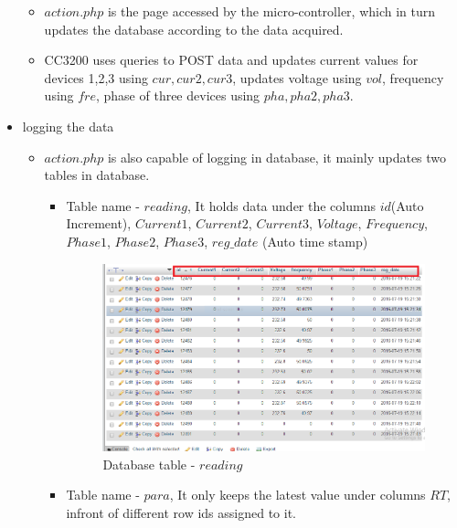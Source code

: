 \documentclass[a4paper,12pt,oneside]{book}
\begin{document}
\begin{itemize}
\begin{itemize}
		\item{$action.php$ is the page accessed by the micro-controller, which in turn updates the database according to the data acquired.}
		\item{CC3200 uses queries to POST data and updates current values for devices 1,2,3 using $cur,cur2,cur3$, updates voltage using $vol$, frequency using $fre$,  phase of three devices using $pha,pha2,pha3$.}
	\end{itemize}
	\newpage
	\item{logging the data}
	\begin{itemize}
		\item {$action.php$ is also capable of logging in database, it mainly  
			updates two tables in database.}
		\begin{itemize}
			\item {Table name - $reading$, It holds data under the columns $id$(Auto Increment), $Current1$, $Current2$, $Current3$, $Voltage$, $Frequency$, $Phase1$, $Phase2$, $Phase3 $, $reg\_date$ (Auto time stamp) }
			\begin{figure}[H]
				\centering
				\includegraphics[width=15cm]{reading.png}
				\caption{Database table - $reading$}
				\label{1}
			\end{figure}
			
			\item{Table name - $para$, It only keeps the latest value under columns $RT$, infront of different row ids assigned to it. }
			

\end{itemize}
\end{itemize}
\end{itemize}
\end{document}
